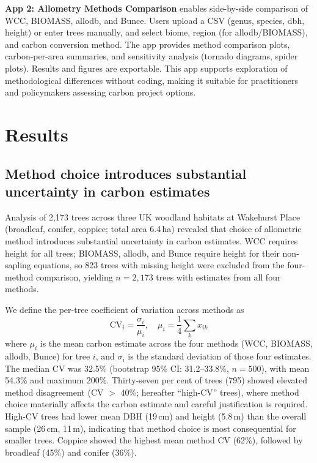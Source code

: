 \documentclass[12pt,a4paper]{article}
\begin{document}
\textbf{App 2: Allometry Methods Comparison} enables side-by-side comparison of WCC, BIOMASS, allodb, and Bunce. Users upload a CSV (genus, species, dbh, height) or enter trees manually, and select biome, region (for allodb/BIOMASS), and carbon conversion method. The app provides method comparison plots, carbon-per-area summaries, and sensitivity analysis (tornado diagrams, spider plots). Results and figures are exportable. This app supports exploration of methodological differences without coding, making it suitable for practitioners and policymakers assessing carbon project options.

\section{Results}

\subsection{Method choice introduces substantial uncertainty in carbon estimates}

Analysis of 2,173 trees across three UK woodland habitats at Wakehurst Place (broadleaf, conifer, coppice; total area 6.4\,ha) revealed that choice of allometric method introduces substantial uncertainty in carbon estimates. WCC requires height for all trees; BIOMASS, allodb, and Bunce require height for their non-sapling equations, so 823 trees with missing height were excluded from the four-method comparison, yielding $n = 2{,}173$ trees with estimates from all four methods.

We define the per-tree coefficient of variation across methods as
\begin{equation}
  \text{CV}_i = \frac{\sigma_i}{\mu_i}, \quad \mu_i = \frac{1}{4}\sum_k x_{ik}
\end{equation}
where $\mu_i$ is the mean carbon estimate across the four methods (WCC, BIOMASS, allodb, Bunce) for tree $i$, and $\sigma_i$ is the standard deviation of those four estimates. The median CV was 32.5\% (bootstrap 95\% CI: 31.2--33.8\%, $n = 500$), with mean 54.3\% and maximum 200\%. Thirty-seven per cent of trees (795) showed elevated method disagreement (CV $>$ 40\%; hereafter ``high-CV'' trees), where method choice materially affects the carbon estimate and careful justification is required. High-CV trees had lower mean DBH (19\,cm) and height (5.8\,m) than the overall sample (26\,cm, 11\,m), indicating that method choice is most consequential for smaller trees. Coppice showed the highest mean method CV (62\%), followed by broadleaf (45\%) and conifer (36\%).
\end{document}
